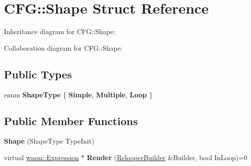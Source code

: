 \hypertarget{struct_c_f_g_1_1_shape}{}\section{C\+FG\+:\+:Shape Struct Reference}
\label{struct_c_f_g_1_1_shape}


Inheritance diagram for C\+FG\+:\+:Shape\+:


Collaboration diagram for C\+FG\+:\+:Shape\+:
\subsection*{Public Types}
\begin{DoxyCompactItemize}
\item 
\mbox{\label{struct_c_f_g_1_1_shape_a688f2c7f4cafc452b1846b261938e615}} 
enum {\bfseries Shape\+Type} \{ {\bfseries Simple}, 
{\bfseries Multiple}, 
{\bfseries Loop}
 \}
\end{DoxyCompactItemize}
\subsection*{Public Member Functions}
\begin{DoxyCompactItemize}
\item 
\mbox{\label{struct_c_f_g_1_1_shape_a7362315af286ef868eed117cae965912}} 
{\bfseries Shape} (Shape\+Type Type\+Init)
\item 
\mbox{\label{struct_c_f_g_1_1_shape_a215060879117a696f47a1fde272b8278}} 
virtual \mbox{\hyperlink{classwasm_1_1_expression}{wasm\+::\+Expression}} $\ast$ {\bfseries Render} (\mbox{\hyperlink{class_c_f_g_1_1_relooper_builder}{Relooper\+Builder}} \&Builder, bool In\+Loop)=0
\end{DoxyCompactItemize}
